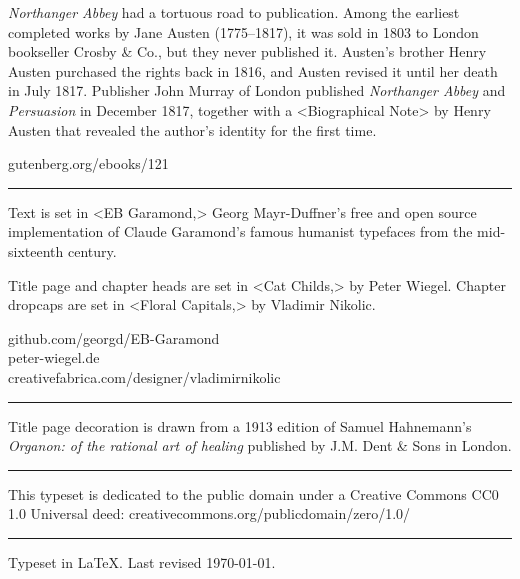 \documentclass[
a5paper,
]{scrbook}
\begin{document}
\centering
\vfill
\begin{minipage}{\textwidth}
\textit{Northanger Abbey} had a tortuous road to publication. Among the earliest completed works by Jane Austen (1775--1817), it was sold in 1803 to London bookseller Crosby \& Co., but they never published it. Austen's brother Henry Austen purchased the rights back in 1816, and Austen revised it until her death in July 1817. Publisher John Murray of London  published \textit{Northanger Abbey} and \textit{Persuasion} in December 1817, together with a <Biographical Note> by Henry Austen that revealed the author's identity for the first time.
\end{minipage}
\vfill
gutenberg.org/ebooks/121
\vfill
\rule{0.5\textwidth}{.4pt}
\vfill
\begin{minipage}{\textwidth}
Text is set in <EB Garamond,> Georg Mayr-Duffner's free and open source implementation of Claude Garamond’s famous humanist typefaces from the mid-sixteenth century. 

Title page and chapter heads are set in <Cat Childs,> by Peter Wiegel. Chapter dropcaps are set in <Floral Capitals,> by Vladimir Nikolic.
\end{minipage}
\vfill
github.com/georgd/EB-Garamond\\peter-wiegel.de\\creativefabrica.com/designer/vladimirnikolic
\vfill
\rule{0.5\textwidth}{.4pt}
\vfill
\begin{minipage}{\textwidth}
Title page decoration is drawn from a 1913 edition of Samuel Hahnemann's \textit{Organon: of the rational art of healing} published by J.M. Dent \& Sons in London.
\end{minipage}
\vfill
\rule{0.5\textwidth}{.4pt}
\vfill
\begin{minipage}{\textwidth}
This typeset is dedicated to the public domain under a Creative Commons CC0 1.0 Universal deed: creativecommons.org/publicdomain/zero/1.0/\\
\end{minipage}
\vfill
\rule{0.5\textwidth}{.4pt}
\vfill
Typeset in \LaTeX{}. Last revised \today.
\vfill
\thispagestyle{empty}
\end{document}
